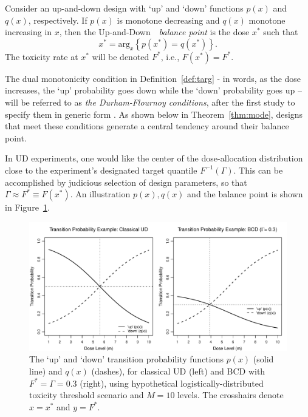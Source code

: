 \begin{defn}\label{def:targ}  Consider an up-and-down design with `up' and `down' functions $p(x)$ and $q(x)$, respectively. If $p(x)$ is monotone decreasing and $q(x)$ monotone increasing in $x$,
then the Up-and-Down\ \  \emph{balance point} is the dose $x^*$ such that
\begin{equation}\label{eq:deftarget}
x^*=\mathrm{arg}_x \left\{p(x^*)=q(x^*)\right\}.
\end{equation}
The toxicity rate at $x^*$ will be denoted $F^*$, i.e., $F(x^*)=F^*$.
\end{defn}

The dual monotonicity condition in Definition~\ref{def:targ} - in words, as the dose increases, the `up' probability goes down while the `down' probability goes up --  will be referred to as \emph{the Durham-Flournoy conditions}, after the first study to specify them in generic form \citep{Durh:Flou:rand:1994,Durh:Flou:up-a:1995}. As shown below in Theorem~\ref{thm:mode}, designs that meet these conditions generate a central tendency around their balance point.

In UD experiments, one would like the center of the dose-allocation distribution close to the experiment's designated target quantile $F^{-1}(\Gamma)$. This can be accomplished by judicious selection of design parameters, so that  $\Gamma\approx F^*\equiv F(x^*)$.  An illustration $p(x),q(x)$ and the balance point is shown in Figure~\ref{fig:pq}.

\begin{figure}
\begin{center}
\includegraphics[scale=0.55]{pqfig}
\caption{The `up' and `down' transition probability functions $p(x)$ (solid line) and $q(x)$ (dashes), for classical UD (left) and BCD with $F^*=\Gamma=0.3$ (right), using hypothetical logistically-distributed toxicity threshold scenario and $M=10$ levels. The crosshairs denote $x=x^*$ and $y=F^*$.}\label{fig:pq}
\end{center}
\end{figure}

